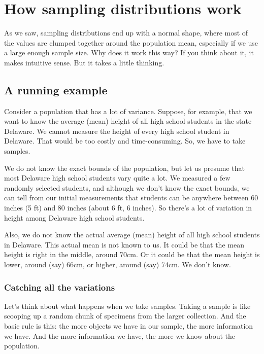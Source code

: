 \documentclass[../../../main.tex]{subfiles}
\begin{document}
\chapter{How sampling distributions work}

As we saw, sampling distributions end up with a normal shape, where most of the values are clumped together around the population mean, especially if we use a large enough sample size. Why does it work this way? If you think about it, it makes intuitive sense. But it takes a little thinking.


\section{A running example}

Consider a population that has a lot of variance. Suppose, for example, that we want to know the average (mean) height of all high school students in the state Delaware. We cannot measure the height of every high school student in Delaware. That would be too costly and time-consuming. So, we have to take samples. 

We do not know the exact bounds of the population, but let us presume that most Delaware high school students vary quite a lot. We measured a few randomly selected students, and although we don't know the exact bounds, we can tell from our initial measurements that students can be anywhere between 60 inches (5 ft) and 80 inches (about 6 ft, 6 inches). So there's a lot of variation in height among Delaware high school students. 

Also, we do not know the actual average (mean) height of all high school students in Delaware. This actual mean is not known to us. It could be that the mean height is right in the middle, around 70cm. Or it could be that the mean height is lower, around (say) 66cm, or higher, around (say) 74cm. We don't know.


\subsection{Catching all the variations}

Let's think about what happens when we take samples. Taking a sample is like scooping up a random chunk of specimens from the larger collection. And the basic rule is this: the more objects we have in our sample, the more information we have. And the more information we have, the more we know about the population. 
\end{document}
